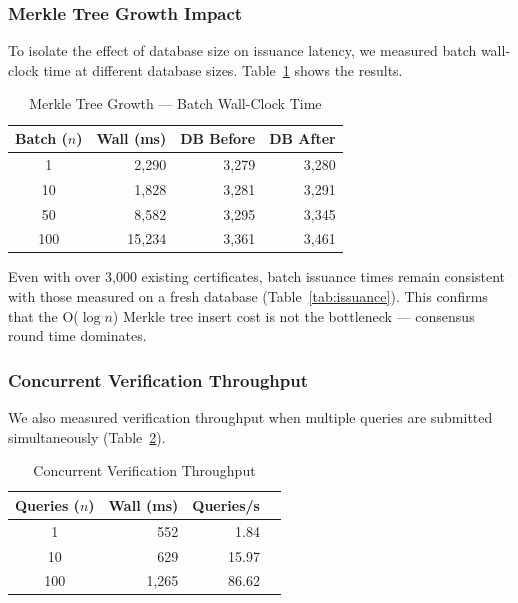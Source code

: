 \documentclass[journal]{IEEEtran}
\begin{document}
\subsubsection{Merkle Tree Growth Impact}
To isolate the effect of database size on issuance latency, we measured batch wall-clock time at different database sizes. Table~\ref{tab:merkle_growth} shows the results.

\begin{table}[t]
\caption{Merkle Tree Growth --- Batch Wall-Clock Time}
\label{tab:merkle_growth}
\centering\small\renewcommand{\arraystretch}{1.1}
\begin{tabular}{@{}crrr@{}}
\toprule
\textbf{Batch ($n$)} & \textbf{Wall (ms)} & \textbf{DB Before} & \textbf{DB After} \\
\midrule
1   & 2{,}290  & 3{,}279 & 3{,}280 \\
10  & 1{,}828  & 3{,}281 & 3{,}291 \\
50  & 8{,}582  & 3{,}295 & 3{,}345 \\
100 & 15{,}234 & 3{,}361 & 3{,}461 \\
\bottomrule
\end{tabular}
\end{table}

Even with over 3,000 existing certificates, batch issuance times remain consistent with those measured on a fresh database (Table~\ref{tab:issuance}). This confirms that the O($\log n$) Merkle tree insert cost is not the bottleneck — consensus round time dominates.

\subsubsection{Concurrent Verification Throughput}
We also measured verification throughput when multiple queries are submitted simultaneously (Table~\ref{tab:conc_verif}).

\begin{table}[t]
\caption{Concurrent Verification Throughput}
\label{tab:conc_verif}
\centering\small\renewcommand{\arraystretch}{1.1}
\begin{tabular}{@{}crrr@{}}
\toprule
\textbf{Queries ($n$)} & \textbf{Wall (ms)} & \textbf{Queries/s} \\
\midrule
1   & 552   & 1.84 \\
10  & 629   & 15.97 \\
100 & 1{,}265 & 86.62 \\
\bottomrule
\end{tabular}
\end{table}
\end{document}
